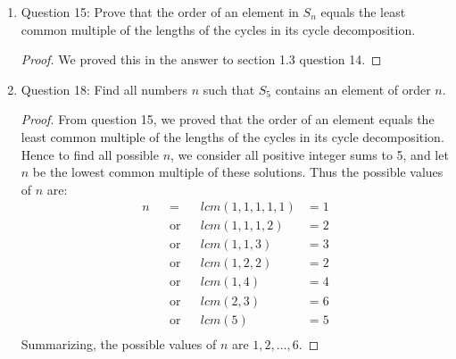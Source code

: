 \documentclass{article}
\begin{document}
\begin{enumerate}
\begin{enumerate}
\begin{proof}
          $\sigma = (1,2)(3,4,5)$ is an explicit example of an element
          in $S_n$ that does not have a prime order. This element has order
          $|(1,2)|\cdot |(3,4,5)| = 2\cdot 3 = 6$, which is not prime.
        \end{proof}
      \item Question 15: Prove that the order of an element in $S_n$ equals
        the least common multiple of the lengths of the cycles in its cycle
        decomposition.
        \begin{proof}
          We proved this in the answer to section 1.3 question 14. 
        \end{proof}
      \item Question 18: Find all numbers $n$ such that $S_5$ contains an
        element of order $n$.
        \begin{proof}
          From question 15, we proved that the order of an element equals
          the least common multiple of the lengths of the cycles in its
          cycle decomposition. Hence to find all possible $n$, we consider
          all positive integer sums to 5, and let $n$ be the lowest common
          multiple of these solutions. Thus the possible values of $n$ are:
          \begin{align*}
            n && =         && lcm(1,1,1,1,1)  & = 1 \\
              && \text{or} && lcm(1,1,1,2)    & = 2 \\
              && \text{or} && lcm(1,1,3)      & = 3 \\
              && \text{or} && lcm(1,2,2)      & = 2 \\
              && \text{or} && lcm(1,4)        & = 4 \\
              && \text{or} && lcm(2,3)        & = 6 \\
              && \text{or} && lcm(5)          & = 5 \\
          \end{align*}
          Summarizing, the possible values of $n$ are $1,2,\ldots,6$.
        \end{proof}
    \end{enumerate}


\end{enumerate}
\end{document}
